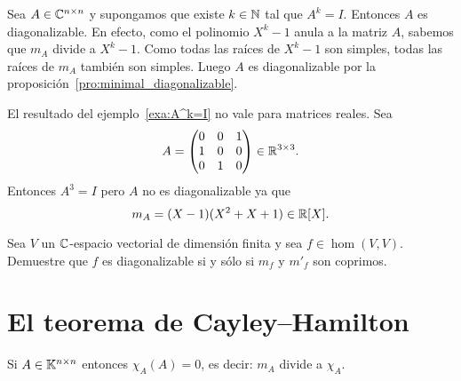 \begin{example}
	\label{exa:A^k=I}
	Sea $A\in\mathbb{C}^{n\times n}$ y supongamos que existe $k\in\mathbb{N}$ tal que $A^k=I$.
	Entonces $A$ es diagonalizable. En efecto, como el polinomio $X^k-1$ anula
	a la matriz $A$, sabemos que $m_A$ divide a $X^k-1$. Como todas las raíces
	de $X^k-1$ son simples, todas las raíces de $m_A$ también son simples.
	Luego $A$ es diagonalizable por la
	proposición~\ref{pro:minimal_diagonalizable}.
\end{example}

\begin{example}
	El resultado del ejemplo~\ref{exa:A^k=I} no vale para matrices reales. Sea 
	\[
		A=\begin{pmatrix}
			0 & 0 & 1\\
			1 & 0 & 0\\
			0 & 1 & 0
		\end{pmatrix}\in\mathbb{R}^{3\times3}.
	\]
	Entonces $A^3=I$ pero $A$ no es diagonalizable ya que 
	\[
		m_A=(X-1)(X^2+X+1)\in\mathbb{R}[X]. 
	\]
\end{example}


\begin{xca}
	Sea $V$ un $\mathbb{C}$-espacio vectorial de dimensión finita y sea
	$f\in\hom(V,V)$. Demuestre que $f$ es diagonalizable si y sólo si $m_f$ y
	$m'_{f}$ son coprimos.
\end{xca}

\section{El teorema de Cayley--Hamilton}


\begin{thm}
	\label{thm:Hamilton_Cayley}
    Si $A\in\mathbb{K}^{n\times n}$ entonces $\chi_A(A)=0$, es decir: $m_A$ divide a
    $\chi_A$. 
\end{thm}

